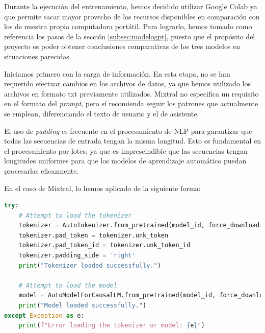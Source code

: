 \bigskip %

Durante la ejecución del entrenamiento, hemos decidido utilizar Google Colab ya que permite sacar mayor provecho de los recursos disponibles en comparación con los de nuestra propia computadora portátil. Para lograrlo, hemos tomado como referencia los pasos de la sección \ref{subsec:modelogpt}, puesto que el propósito del proyecto es poder obtener conclusiones comparativas de los tres modelos en situaciones parecidas.

\bigskip %

Iniciamos primero con la carga de información. En esta etapa, no se han requerido efectuar cambios en los archivos de datos, ya que hemos utilizado los archivos en formato txt previamente utilizados. Mixtral no especifica un requisito en el formato del \textit{prompt}, pero sí recomienda seguir los patrones que actualmente se emplean, diferenciando el texto de usuario y el de asistente.

\bigskip %

El uso de \textit{padding} es frecuente en el procesamiento de \acrshort{NLP} para garantizar que todas las secuencias de entrada tengan la misma longitud. Esto es fundamental en el procesamiento por lotes, ya que es imprescindible que las secuencias tengan longitudes uniformes para que los modelos de aprendizaje automático puedan procesarlas eficazmente.

\bigskip %

En el caso de Mixtral, lo hemos aplicado de la siguiente forma:

\bigskip %

\begin{lstlisting}[language=Python, caption={Parámetro de padding.}, label=listado4]
try:
    # Attempt to load the tokenizer
    tokenizer = AutoTokenizer.from_pretrained(model_id, force_download=True)
    tokenizer.pad_token = tokenizer.unk_token
    tokenizer.pad_token_id = tokenizer.unk_token_id
    tokenizer.padding_side = 'right'
    print("Tokenizer loaded successfully.")

    # Attempt to load the model
    model = AutoModelForCausalLM.from_pretrained(model_id, force_download=True)
    print("Model loaded successfully.")
except Exception as e:
    print(f"Error loading the tokenizer or model: {e}")
\end{lstlisting}

\bigskip %

